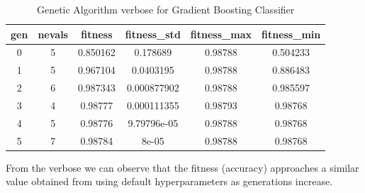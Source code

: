 \begin{table}[H]
\centering
\caption{Genetic Algorithm verbose for Gradient Boosting Classifier}
\label{tab:GBCverbose}
\begin{tabular}{|c|c|c|c|c|c|}
\hline
gen & nevals & fitness & fitness\_std & fitness\_max & fitness\_min \\
\hline
0   & 5      & 0.850162 & 0.178689    & 0.98788     & 0.504233    \\
1   & 5      & 0.967104 & 0.0403195   & 0.98788     & 0.886483    \\
2   & 6      & 0.987343 & 0.000877902 & 0.98788     & 0.985597    \\
3   & 4      & 0.98777  & 0.000111355 & 0.98793     & 0.98768     \\
4   & 5      & 0.98776  & 9.79796e-05 & 0.98788     & 0.98768     \\
5   & 7      & 0.98784  & 8e-05       & 0.98788     & 0.98768     \\
\hline
\end{tabular}
\end{table}

From the verbose we can observe that the fitness (accuracy) approaches a similar value obtained from using default hyperparameters as generations increase.


